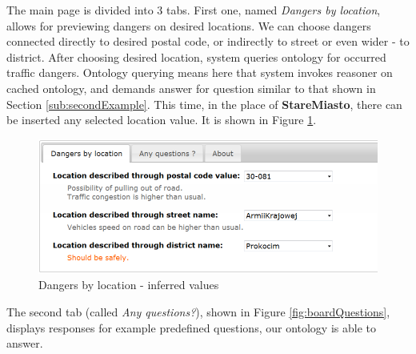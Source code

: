 \noindent The main page is divided into 3 tabs. First one, named \textit{Dangers by location}, allows for previewing dangers on desired locations. We can choose dangers connected directly to desired postal code, or indirectly to street or even wider - to district. After choosing desired location, system queries ontology for occurred traffic dangers. Ontology querying means here that system invokes reasoner on cached ontology, and demands answer for question similar to that shown in Section \ref{sub:secondExample}. This time, in the place of \textbf{StareMiasto}, there can be inserted any selected location value. It is shown in Figure \ref{fig:boardMainInferred}.

\newpage

\begin{figure}[htp]
\centering
\includegraphics[scale=0.5]{images/chapter4/BoardMainInferred}
\caption{Dangers by location - inferred values}
\label{fig:boardMainInferred}
\end{figure}

\noindent The second tab (called \textit{Any questions?}), shown in Figure \ref{fig:boardQuestions}, displays responses for example predefined questions, our ontology is able to answer.


